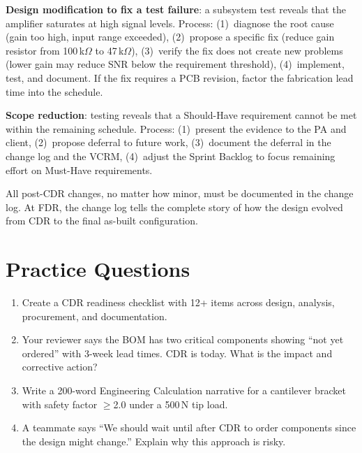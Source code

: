 \textbf{Design modification to fix a test failure}: a subsystem test reveals that the amplifier saturates at high signal levels. Process: (1)~diagnose the root cause (gain too high, input range exceeded), (2)~propose a specific fix (reduce gain resistor from 100\,k$\Omega$ to 47\,k$\Omega$), (3)~verify the fix does not create new problems (lower gain may reduce SNR below the requirement threshold), (4)~implement, test, and document. If the fix requires a PCB revision, factor the fabrication lead time into the schedule.

\textbf{Scope reduction}: testing reveals that a Should-Have requirement cannot be met within the remaining schedule. Process: (1)~present the evidence to the PA and client, (2)~propose deferral to future work, (3)~document the deferral in the change log and the VCRM, (4)~adjust the Sprint Backlog to focus remaining effort on Must-Have requirements.

All post-CDR changes, no matter how minor, must be documented in the change log. At FDR, the change log tells the complete story of how the design evolved from CDR to the final as-built configuration.


\section{Practice Questions}
\begin{enumerate}[leftmargin=1.5em]
\item Create a CDR readiness checklist with 12+ items across design, analysis, procurement, and documentation.
\item Your reviewer says the BOM has two critical components showing ``not yet ordered'' with 3-week lead times. CDR is today. What is the impact and corrective action?
\item Write a 200-word Engineering Calculation narrative for a cantilever bracket with safety factor $\geq$2.0 under a 500\,N tip load.
\item A teammate says ``We should wait until after CDR to order components since the design might change.'' Explain why this approach is risky.
\end{enumerate}


